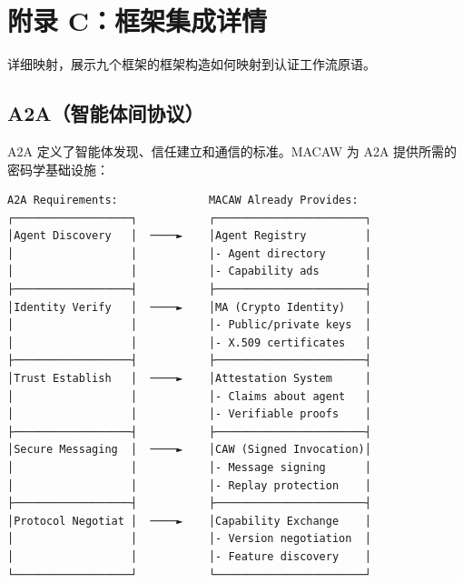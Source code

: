 \section*{附录 C：框架集成详情}
\label{appendix:framework-details}

{\scriptsize
详细映射，展示九个框架的框架构造如何映射到认证工作流原语。

\subsection*{A2A（智能体间协议）}

A2A 定义了智能体发现、信任建立和通信的标准。MACAW 为 A2A 提供所需的密码学基础设施：

{\tiny
\begin{verbatim}
A2A Requirements:              MACAW Already Provides:
┌──────────────────┐           ┌───────────────────────┐
│Agent Discovery   │  ────►    │Agent Registry         │
│                  │           │- Agent directory      │
│                  │           │- Capability ads       │
├──────────────────┤           ├───────────────────────┤
│Identity Verify   │  ────►    │MA (Crypto Identity)   │
│                  │           │- Public/private keys  │
│                  │           │- X.509 certificates   │
├──────────────────┤           ├───────────────────────┤
│Trust Establish   │  ────►    │Attestation System     │
│                  │           │- Claims about agent   │
│                  │           │- Verifiable proofs    │
├──────────────────┤           ├───────────────────────┤
│Secure Messaging  │  ────►    │CAW (Signed Invocation)│
│                  │           │- Message signing      │
│                  │           │- Replay protection    │
├──────────────────┤           ├───────────────────────┤
│Protocol Negotiat │  ────►    │Capability Exchange    │
│                  │           │- Version negotiation  │
│                  │           │- Feature discovery    │
└──────────────────┘           └───────────────────────┘


\end{verbatim}}}
